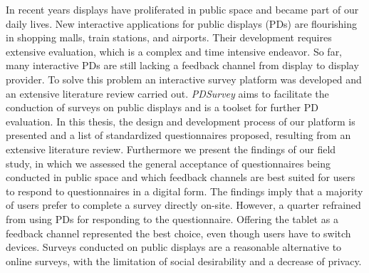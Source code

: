 	In recent years displays have proliferated in public space and became part of our daily lives. New interactive applications for public displays (PDs) are flourishing in shopping malls, train stations, and airports. Their development requires extensive evaluation, which is a complex and time intensive endeavor. So far, many interactive PDs are still lacking a feedback channel from display to display provider. To solve this problem an interactive survey platform was developed and an extensive literature review carried out.
	\textit{PDSurvey} aims to facilitate the conduction of surveys on public displays and is a toolset for further PD evaluation. In this thesis, the design and development process of our platform is presented and a list of standardized questionnaires proposed, resulting from an extensive literature review. Furthermore we present the findings of our field study, in which we assessed the general acceptance of questionnaires being conducted in public space and which feedback channels are best suited for users to respond to questionnaires in a digital form.
	The findings imply that a majority of users prefer to complete a survey directly on-site. However, a quarter refrained from using PDs for responding to the questionnaire. Offering the tablet as a feedback channel represented the best choice, even though users have to switch devices. Surveys conducted on public displays are a reasonable alternative to online surveys, with the limitation of social desirability and a decrease of privacy.
	








